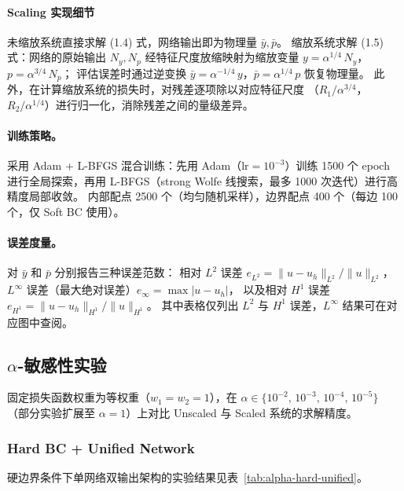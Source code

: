 \documentclass[UTF8, 12pt]{ctexart}
\begin{document}
\paragraph{Scaling 实现细节}

未缩放系统直接求解 (1.4) 式，网络输出即为物理量 $\bar{y},\bar{p}$。
缩放系统求解 (1.5) 式：网络的原始输出 $N_y, N_p$ 经特征尺度放缩映射为缩放变量
$y = \alpha^{1/4}\,N_y$，$p = \alpha^{3/4}\,N_p$；
评估误差时通过逆变换 $\bar{y} = \alpha^{-1/4}\,y$，$\bar{p} = \alpha^{1/4}\,p$
恢复物理量。
此外，在计算缩放系统的损失时，对残差逐项除以对应特征尺度
（$R_1/\alpha^{3/4}$，$R_2/\alpha^{1/4}$）进行归一化，消除残差之间的量级差异。

\paragraph{训练策略。}
采用 Adam + L-BFGS 混合训练：先用 Adam（$\mathrm{lr}=10^{-3}$）训练 1500 个 epoch
进行全局探索，再用 L-BFGS（strong Wolfe 线搜索，最多 1000 次迭代）进行高精度局部收敛。
内部配点 2500 个（均匀随机采样），边界配点 400 个（每边 100 个，仅 Soft BC 使用）。

\paragraph{误差度量。}
对 $\bar{y}$ 和 $\bar{p}$ 分别报告三种误差范数：
相对 $L^2$ 误差 $e_{L^2} = \|u - u_h\|_{L^2}\big/\|u\|_{L^2}$，
$L^\infty$ 误差（最大绝对误差）$e_\infty = \max|u - u_h|$，
以及相对 $H^1$ 误差 $e_{H^1} = \|u - u_h\|_{H^1}\big/\|u\|_{H^1}$。
其中表格仅列出 $L^2$ 与 $H^1$ 误差，$L^\infty$ 结果可在对应图中查阅。


\subsection{$\alpha$-敏感性实验}
\label{subsec:alpha-test}

固定损失函数权重为等权重（$w_1 = w_2 = 1$），在
$\alpha \in \{10^{-2},\,10^{-3},\,10^{-4},\,10^{-5}\}$
（部分实验扩展至 $\alpha = 1$）上对比 Unscaled 与 Scaled 系统的求解精度。

\subsubsection{Hard BC + Unified Network}

硬边界条件下单网络双输出架构的实验结果见表~\ref{tab:alpha-hard-unified}。
\end{document}
